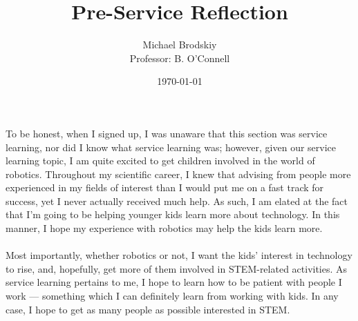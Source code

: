 


\title{Pre-Service Reflection}
\date{\today}
\author{Michael Brodskiy\\ \small Professor: B. O'Connell}



\maketitle

\paragraph{} To be honest, when I signed up, I was unaware that this section was service learning, nor did I know what service learning was; however, given our service learning topic, I am quite excited to get children involved in the world of robotics. Throughout my scientific career, I knew that advising from people more experienced in my fields of interest than I would put me on a fast track for success, yet I never actually received much help. As such, I am elated at the fact that I'm going to be helping younger kids learn more about technology. In this manner, I hope my experience with robotics may help the kids learn more.

\paragraph{} Most importantly, whether robotics or not, I want the kids' interest in technology to rise, and, hopefully, get more of them involved in STEM-related activities. As service learning pertains to me, I hope to learn how to be patient with people I work — something which I can definitely learn from working with kids. In any case, I hope to get as many people as possible interested in STEM.



